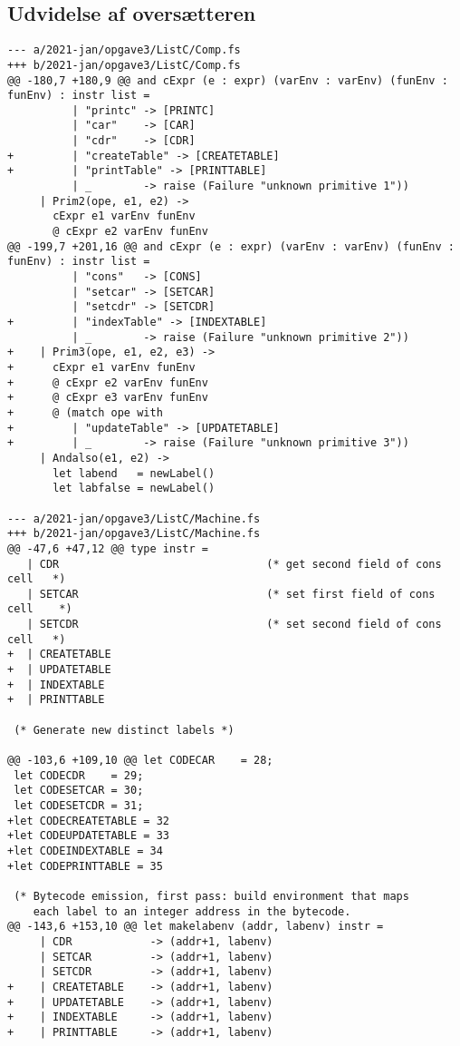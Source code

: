 \subsection{Udvidelse af oversætteren}

\begin{verbatim}
--- a/2021-jan/opgave3/ListC/Comp.fs
+++ b/2021-jan/opgave3/ListC/Comp.fs
@@ -180,7 +180,9 @@ and cExpr (e : expr) (varEnv : varEnv) (funEnv : funEnv) : instr list =
          | "printc" -> [PRINTC]
          | "car"    -> [CAR]
          | "cdr"    -> [CDR]
+         | "createTable" -> [CREATETABLE]
+         | "printTable" -> [PRINTTABLE]
          | _        -> raise (Failure "unknown primitive 1"))
     | Prim2(ope, e1, e2) ->
       cExpr e1 varEnv funEnv
       @ cExpr e2 varEnv funEnv
@@ -199,7 +201,16 @@ and cExpr (e : expr) (varEnv : varEnv) (funEnv : funEnv) : instr list =
          | "cons"   -> [CONS]
          | "setcar" -> [SETCAR]
          | "setcdr" -> [SETCDR]
+         | "indexTable" -> [INDEXTABLE]
          | _        -> raise (Failure "unknown primitive 2"))
+    | Prim3(ope, e1, e2, e3) ->
+      cExpr e1 varEnv funEnv
+      @ cExpr e2 varEnv funEnv
+      @ cExpr e3 varEnv funEnv
+      @ (match ope with
+         | "updateTable" -> [UPDATETABLE]
+         | _        -> raise (Failure "unknown primitive 3"))
     | Andalso(e1, e2) ->
       let labend   = newLabel()
       let labfalse = newLabel()

--- a/2021-jan/opgave3/ListC/Machine.fs
+++ b/2021-jan/opgave3/ListC/Machine.fs
@@ -47,6 +47,12 @@ type instr =
   | CDR                                (* get second field of cons cell   *)
   | SETCAR                             (* set first field of cons cell    *)
   | SETCDR                             (* set second field of cons cell   *)
+  | CREATETABLE
+  | UPDATETABLE
+  | INDEXTABLE
+  | PRINTTABLE
 
 (* Generate new distinct labels *)
 
@@ -103,6 +109,10 @@ let CODECAR    = 28;
 let CODECDR    = 29;
 let CODESETCAR = 30;
 let CODESETCDR = 31;
+let CODECREATETABLE = 32
+let CODEUPDATETABLE = 33
+let CODEINDEXTABLE = 34
+let CODEPRINTTABLE = 35
 
 (* Bytecode emission, first pass: build environment that maps 
    each label to an integer address in the bytecode.
@@ -143,6 +153,10 @@ let makelabenv (addr, labenv) instr =
     | CDR            -> (addr+1, labenv)
     | SETCAR         -> (addr+1, labenv)
     | SETCDR         -> (addr+1, labenv)
+    | CREATETABLE    -> (addr+1, labenv)
+    | UPDATETABLE    -> (addr+1, labenv)
+    | INDEXTABLE     -> (addr+1, labenv)
+    | PRINTTABLE     -> (addr+1, labenv)
 

\end{verbatim}
